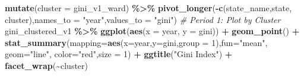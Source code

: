 \documentclass[11pt,a4paper,]{article}
\newenvironment{Shaded}{\begin{snugshade}}{\end{snugshade}}
\newcommand{\AttributeTok}[1]{\textcolor[rgb]{0.13,0.29,0.53}{#1}}
\newcommand{\CommentTok}[1]{\textcolor[rgb]{0.56,0.35,0.01}{\textit{#1}}}
\newcommand{\DecValTok}[1]{\textcolor[rgb]{0.00,0.00,0.81}{#1}}
\newcommand{\FunctionTok}[1]{\textcolor[rgb]{0.13,0.29,0.53}{\textbf{#1}}}
\newcommand{\NormalTok}[1]{#1}
\newcommand{\SpecialCharTok}[1]{\textcolor[rgb]{0.81,0.36,0.00}{\textbf{#1}}}
\newcommand{\StringTok}[1]{\textcolor[rgb]{0.31,0.60,0.02}{#1}}
\begin{document}
\begin{Shaded}
\begin{Highlighting}[]
  \FunctionTok{mutate}\NormalTok{(}\AttributeTok{cluster =}\NormalTok{ gini\_v1\_ward) }\SpecialCharTok{\%\textgreater{}\%}
  \FunctionTok{pivot\_longer}\NormalTok{(}\SpecialCharTok{{-}}\FunctionTok{c}\NormalTok{(state\_name,state, cluster),}\AttributeTok{names\_to =} \StringTok{"year"}\NormalTok{,}\AttributeTok{values\_to =} \StringTok{"gini"}\NormalTok{)}
\CommentTok{\# Period 1: Plot by Cluster}
\NormalTok{gini\_clustered\_v1 }\SpecialCharTok{\%\textgreater{}\%}
  \FunctionTok{ggplot}\NormalTok{(}\FunctionTok{aes}\NormalTok{(}\AttributeTok{x =}\NormalTok{ year, }\AttributeTok{y =}\NormalTok{ gini)) }\SpecialCharTok{+}
  \FunctionTok{geom\_point}\NormalTok{() }\SpecialCharTok{+}
  \FunctionTok{stat\_summary}\NormalTok{(}\AttributeTok{mapping=}\FunctionTok{aes}\NormalTok{(}\AttributeTok{x=}\NormalTok{year,}\AttributeTok{y=}\NormalTok{gini,}\AttributeTok{group =} \DecValTok{1}\NormalTok{),}\AttributeTok{fun=}\StringTok{"mean"}\NormalTok{, }\AttributeTok{geom=}\StringTok{"line"}\NormalTok{, }\AttributeTok{color=}\StringTok{"red"}\NormalTok{,}\AttributeTok{size =} \DecValTok{1}\NormalTok{) }\SpecialCharTok{+}
  \FunctionTok{ggtitle}\NormalTok{(}\StringTok{"Gini Index"}\NormalTok{) }\SpecialCharTok{+}
  \FunctionTok{facet\_wrap}\NormalTok{(}\SpecialCharTok{\textasciitilde{}}\NormalTok{cluster)}
\end{Highlighting}
\end{Shaded}
\end{document}
